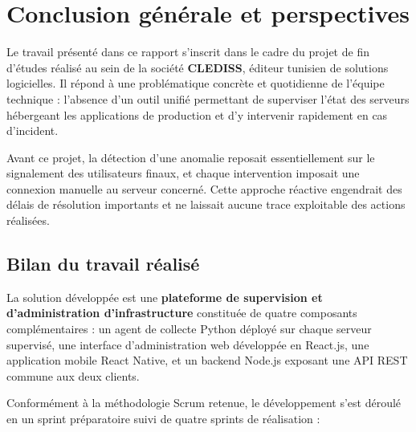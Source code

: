 \thispagestyle{fancy}

\chapter*{Conclusion générale et perspectives}

Le travail présenté dans ce rapport s'inscrit dans le cadre du projet de fin d'études
réalisé au sein de la société \textbf{CLEDISS}, éditeur tunisien de solutions logicielles.
Il répond à une problématique concrète et quotidienne de l'équipe technique :
l'absence d'un outil unifié permettant de superviser l'état des serveurs hébergeant les
applications de production et d'y intervenir rapidement en cas d'incident.

Avant ce projet, la détection d'une anomalie reposait essentiellement sur le signalement
des utilisateurs finaux, et chaque intervention imposait une connexion manuelle au
serveur concerné. Cette approche réactive engendrait des délais de résolution importants
et ne laissait aucune trace exploitable des actions réalisées.

\section*{Bilan du travail réalisé}

La solution développée est une \textbf{plateforme de supervision et d'administration
d'infrastructure} constituée de quatre composants complémentaires : un agent de collecte
Python déployé sur chaque serveur supervisé, une interface d'administration web
développée en React.js, une application mobile React Native, et un backend Node.js
exposant une API REST commune aux deux clients.

Conformément à la méthodologie Scrum retenue, le développement s'est déroulé en un sprint
préparatoire suivi de quatre sprints de réalisation :


